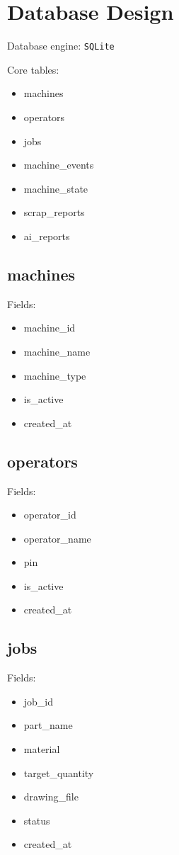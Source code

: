 \documentclass[11pt]{article}
\begin{document}
\section{Database Design}
Database engine: \texttt{SQLite}

Core tables:
\begin{itemize}
\item machines
\item operators
\item jobs
\item machine\_events
\item machine\_state
\item scrap\_reports
\item ai\_reports
\end{itemize}

\subsection{machines}
Fields:
\begin{itemize}
\item machine\_id
\item machine\_name
\item machine\_type
\item is\_active
\item created\_at
\end{itemize}

\subsection{operators}
Fields:
\begin{itemize}
\item operator\_id
\item operator\_name
\item pin
\item is\_active
\item created\_at
\end{itemize}

\subsection{jobs}
Fields:
\begin{itemize}
\item job\_id
\item part\_name
\item material
\item target\_quantity
\item drawing\_file
\item status
\item created\_at
\end{itemize}
\end{document}
